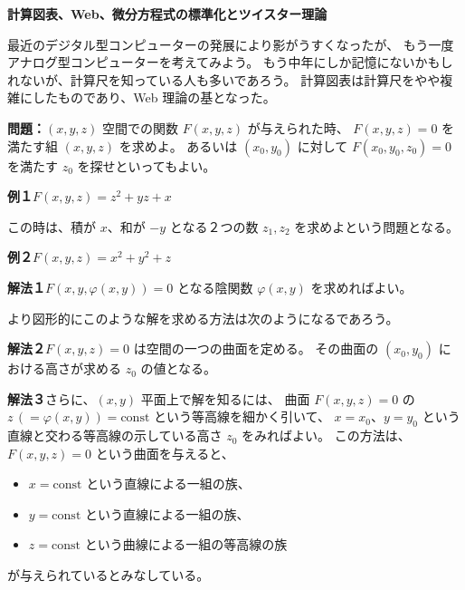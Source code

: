 \documentclass[uplatex,dvipdfmx]{jlreq}
\begin{document}
\thispagestyle{empty}

\noindent
{\large\bfseries 計算図表、Web、微分方程式の標準化とツイスター理論}

\medskip
\hspace*{\fill}{\large\bfseries 佐藤 肇（名古屋大学・多元数理）}

\bigskip\bigskip

最近のデジタル型コンピューターの発展により影がうすくなったが、
もう一度アナログ型コンピューターを考えてみよう。
もう中年にしか記憶にないかもしれないが、計算尺を知っている人も多いであろう。
計算図表は計算尺をやや複雑にしたものであり、Web 理論の基となった。

\bigskip

\noindent\textbf{問題：}$(x,y,z)$ 空間での関数 $F(x,y,z)$ が与えられた時、
$F(x,y,z) = 0$ を満たす組 $(x,y,z)$ を求めよ。
あるいは $(x_0, y_0)$ に対して $F(x_0, y_0, z_0) = 0$ を満たす $z_0$ を探せといってもよい。

\bigskip

\noindent\textbf{例１}\quad $F(x,y,z) = z^2 + yz + x$

この時は、積が $x$、和が $-y$ となる２つの数 $z_1, z_2$ を求めよという問題となる。

\medskip

\noindent\textbf{例２}\quad $F(x,y,z) = x^2 + y^2 + z$

\bigskip

\noindent\textbf{解法１}\quad $F(x,y,\varphi(x,y)) = 0$ となる陰関数 $\varphi(x,y)$ を求めればよい。

\medskip

より図形的にこのような解を求める方法は次のようになるであろう。

\medskip

\noindent\textbf{解法２}\quad $F(x,y,z) = 0$ は空間の一つの曲面を定める。
その曲面の $(x_0, y_0)$ における高さが求める $z_0$ の値となる。

\medskip

\noindent\textbf{解法３}\quad さらに、$(x,y)$ 平面上で解を知るには、
曲面 $F(x,y,z) = 0$ の $z\,(= \varphi(x,y)) = \mathrm{const}$ という等高線を細かく引いて、
$x = x_0$、$y = y_0$ という直線と交わる等高線の示している高さ $z_0$ をみればよい。
この方法は、$F(x,y,z) = 0$ という曲面を与えると、
\begin{itemize}
  \setlength{\itemsep}{2pt}
  \item $x = \mathrm{const}$ という直線による一組の族、
  \item $y = \mathrm{const}$ という直線による一組の族、
  \item $z = \mathrm{const}$ という曲線による一組の等高線の族
\end{itemize}
が与えられているとみなしている。
\end{document}
